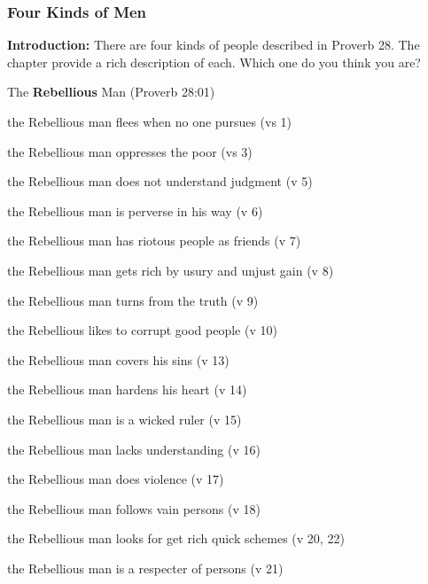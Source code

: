 \subsubsection{Four Kinds of Men}
\textbf{Introduction: }There are four kinds of people described in Proverb 28. The chapter provide a rich description of each. Which one do you think you are?%
\begin{compactenum}[I.]
    \item The \textbf{Rebellious} Man (Proverb 28:01) 
    \begin{compactenum}[A.]
    	\item the Rebellious man flees when no one pursues (vs 1)
    	\item the Rebellious man oppresses the poor (vs 3)
    	\item the Rebellious man does not understand judgment (v 5)
    	\item the Rebellious man is perverse in his way (v 6)
    	\item the Rebellious man has riotous people as friends (v 7)
    	\item the Rebellious man gets rich by usury and unjust gain (v 8)
    	\item the Rebellious man turns from the truth (v 9)
    	\item the Rebellious likes to corrupt good  people (v 10)
    	\item the Rebellious man covers his sins (v 13)
    	\item the Rebellious man hardens his heart (v 14)
    	\item the Rebellious man is a wicked ruler (v 15)
    	\item the Rebellious man lacks understanding (v 16)
    	\item the Rebellious man does violence (v 17)
    	\item the Rebellious man follows vain persons (v 18)
    	\item the Rebellious man looks for get rich quick schemes (v 20, 22)
    	\item the Rebellious man is a respecter of persons (v 21)

\end{compactenum}
\end{compactenum}
